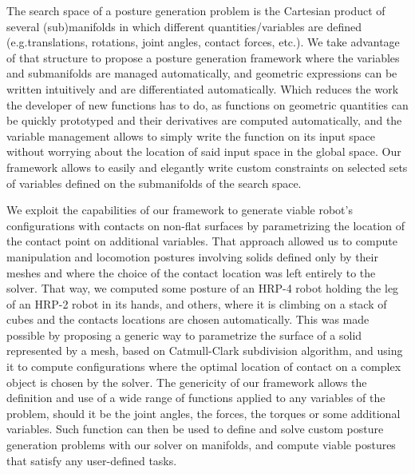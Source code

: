 The search space of a posture generation problem is the Cartesian product of several (sub)manifolds in which different quantities/variables are defined (e.g.translations, rotations, joint angles, contact forces, etc.).
We take advantage of that structure to propose a posture generation framework where the variables and submanifolds are managed automatically, and geometric expressions can be written intuitively and are differentiated automatically.
Which reduces the work the developer of new functions has to do, as functions on geometric quantities can be quickly prototyped and their derivatives are computed automatically, and the variable management allows to simply write the function on its input space without worrying about the location of said input space in the global space.
Our framework allows to easily and elegantly write custom constraints on selected sets of variables defined on the submanifolds of the search space.

We exploit the capabilities of our framework to generate viable robot's configurations with contacts on non-flat surfaces by parametrizing the location of the contact point on additional variables.
That approach allowed us to compute manipulation and locomotion postures involving solids defined only by their meshes and where the choice of the contact location was left entirely to the solver.
That way, we computed some posture of an HRP-4 robot holding the leg of an HRP-2 robot in its hands, and others, where it is climbing on a stack of cubes and the contacts locations are chosen automatically.
This was made possible by proposing a generic way to parametrize the surface of a solid represented by a mesh, based on Catmull-Clark subdivision algorithm, and using it to compute configurations where the optimal location of contact on a complex object is chosen by the solver.
The genericity of our framework allows the definition and use of a wide range of functions applied to any variables of the problem, should it be the joint angles, the forces, the torques or some additional variables.
Such function can then be used to define and solve custom posture generation problems with our solver on manifolds, and compute viable postures that satisfy any user-defined tasks.

